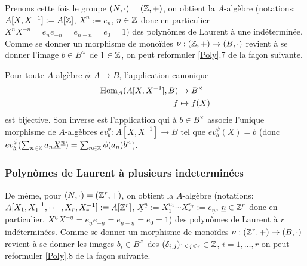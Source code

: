   Prenons cette fois le groupe $(N,\cdot)=(\mathbb{Z},+)$, on obtient la $A$-algèbre (notations:  $A[X,X^{-1}]:=A[\mathbb{Z}]$, $X^n:=e_n$, $n\in \mathbb{Z}$ donc en particulier $X^nX^{-n}=e_ne_{-n}=e_{n-n}=e_0=1$) des polynômes de Laurent à une indéterminée. Comme se donner    un morphisme de monoïdes $\nu:(\mathbb{Z},+)\rightarrow (B ,\cdot)$ revient à se donner l'image  $b \in B^\times $ de $1\in \mathbb{Z}$, on peut reformuler \ref{Poly}.7 de la façon suivante.\\

\begin{definition}Pour toute $A$-algèbre $\phi:A\rightarrow B$,  l'application canonique
\begin{align*}\operatorname{Hom}_A(A[X,X^{-1}],B) &\to B^\times \\ f&\mapsto f(X)\end{align*}
est bijective. Son inverse est l'application qui à $b \in B^\times$ associe l'unique morphisme de $A$-algèbres $ev_{\underline{b}}^\phi:A[X,X^{-1}]\rightarrow B$ tel que $ev_{\underline{b}}^\phi(X)=b$ (donc $ev_{\underline{b}}^\phi(\sum_{n\in \mathbb{Z}}a_n\underline{X}^{\underline{n}})=\sum_{n\in \mathbb{Z}}\phi(a_n)b^n$).\end{definition}

  \subsubsection{Polynômes de Laurent à plusieurs indeterminées}
  
  De même, pour $(N,\cdot)=(\mathbb{Z}^r,+)$, on obtient la $A$-algèbre (notations:  $A[X_1,X_1^{-1},\cdots, X_r,X_r^{-1}]:=A[\mathbb{Z}^r]$, $\underline{X}^{\underline{n}}:=X_1^{n_1}\cdots X_r^{n_r}:=e_{\underline{n}}$, $\underline{n}\in \mathbb{Z}^r$ donc en particulier, $\underline{X}^{\underline{n}}\underline{X}^{-\underline{n}}= e_{\underline{n}}e_{-\underline{n}}=e_{\underline{n}-\underline{n}}=e_0=1$) des polynômes de Laurent à $r$ indéterminées. Comme se donner    un morphisme de monoïdes $\nu:(\mathbb{Z}^r,+)\rightarrow (B ,\cdot)$ revient à se donner les images $b_i \in B^\times $ des $(\delta_{i,j})_{1\leq j\leq r}\in \mathbb{Z}$, $i=1,\dots, r$ on peut reformuler \ref{Poly}.8 de la façon suivante.


